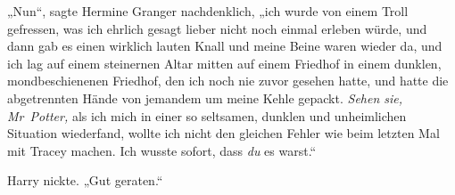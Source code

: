 „Nun“, sagte Hermine Granger nachdenklich, „ich wurde von einem Troll gefressen, was ich ehrlich gesagt lieber nicht noch einmal erleben würde, und dann gab es einen wirklich lauten Knall und meine Beine waren wieder da, und ich lag auf einem steinernen Altar mitten auf einem Friedhof in einem dunklen, mondbeschienenen Friedhof, den ich noch nie zuvor gesehen hatte, und hatte die abgetrennten Hände von jemandem um meine Kehle gepackt. \emph{Sehen sie, Mr~Potter,} als ich mich in einer so seltsamen, dunklen und unheimlichen Situation wiederfand, wollte ich nicht den gleichen Fehler wie beim letzten Mal mit Tracey machen. Ich wusste sofort, dass \emph{du} es warst.“

Harry nickte.
„Gut geraten.“


